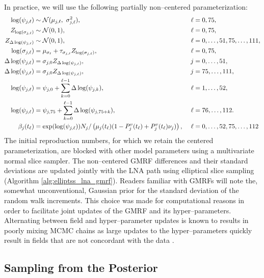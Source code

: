 In practice, we will use the following partially non--centered parameterization:
\begin{align}
\log(\psi_{j,\ell}) &\sim \mcN(\mu_{j,\ell},\ \sigma_{j,\ell}^2),&\ \ell &= 0,75, \nonumber\\
Z_{\log(\sigma_{j,\ell})} &\sim \mcN(0,1),&\ \ell&=0,75, \nonumber \\
Z_{\Delta\log(\psi_{j,\ell})} &\sim \mcN(0,1),&\ \ell&=0,\dots,51,75,\dots,111, \nonumber \\ 
\log(\sigma_{j,\ell}) &= \mu_{\sigma_\ell} + \tau_{\sigma_{j,\ell}}Z_{\log(\sigma_{j,\ell})},&\ \ell &= 0,75,\nonumber\\
\Delta\log(\psi_{j,\ell})&= \sigma_{j,0} Z_{\Delta\log(\psi_{j,\ell})},&\ j&=0,\dots,51, \nonumber\\
\Delta\log(\psi_{j,\ell})&= \sigma_{j,0} Z_{\Delta\log(\psi_{j,\ell})},&\ j&=75,\dots,111, \nonumber\\
\log(\psi_{j,\ell}) &= \psi_{j,0} + \sum_{k=0}^{\ell-1}\Delta\log(\psi_{j,k}),&\ \ell &= 1,\dots,52, \nonumber\\
\log(\psi_{j,\ell}) &= \psi_{j,75} + \sum_{k=0}^{\ell-1}\Delta\log(\psi_{j,75+k}),&\ \ell &= 76,\dots,112. \nonumber\\
\beta_j(t_\ell) &= \exp(\log(\psi_{j,\ell}))N_j/\left (\mu_{j}(t_\ell)(1 - P^v_j(t_\ell) + P_j^v(t_\ell)\nu_j)\right ),&\ \ell&=0,\dots,52,75,\dots,112 \nonumber
\end{align}
The initial reproduction numbers, for which we retain the centered parameterization, are blocked with other model parameters using a multivariate normal slice sampler. The non--centered GMRF differences and their standard deviations are updated jointly with the LNA path using elliptical slice sampling (Algorithm \ref{alg:elliptss_lna_gmrf}). Readers familiar with GMRFs will note the, somewhat unconventional, Gaussian prior for the standard deviation of the random walk increments. This choice was made for computational reasons in order to facilitate joint updates of the GMRF and its hyper--parameters. Alternating between field and hyper--parameter updates is known to results in poorly mixing MCMC chains as large updates to the hyper--parameters quickly result in fields that are not concordant with the data  \cite{knorr2002block,murray2010hyper}. 

\subsection{Sampling from the Posterior}
\label{subsec:flu_model}


